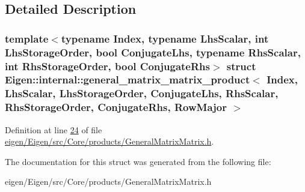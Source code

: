 \subsection{Detailed Description}
\subsubsection*{template$<$typename Index, typename Lhs\+Scalar, int Lhs\+Storage\+Order, bool Conjugate\+Lhs, typename Rhs\+Scalar, int Rhs\+Storage\+Order, bool Conjugate\+Rhs$>$\newline
struct Eigen\+::internal\+::general\+\_\+matrix\+\_\+matrix\+\_\+product$<$ Index, Lhs\+Scalar, Lhs\+Storage\+Order, Conjugate\+Lhs, Rhs\+Scalar, Rhs\+Storage\+Order, Conjugate\+Rhs, Row\+Major $>$}



Definition at line \hyperlink{eigen_2_eigen_2src_2_core_2products_2_general_matrix_matrix_8h_source_l00024}{24} of file \hyperlink{eigen_2_eigen_2src_2_core_2products_2_general_matrix_matrix_8h_source}{eigen/\+Eigen/src/\+Core/products/\+General\+Matrix\+Matrix.\+h}.



The documentation for this struct was generated from the following file\+:\begin{DoxyCompactItemize}
\item 
eigen/\+Eigen/src/\+Core/products/\+General\+Matrix\+Matrix.\+h\end{DoxyCompactItemize}
